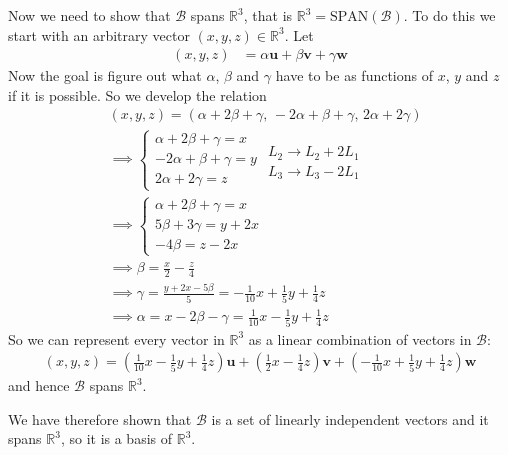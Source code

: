 {\noindent Now we need to show that $\mathcal{B}$ spans $\mathbb{R}^3$, that is $\mathbb{R}^3 = \text{SPAN}(\mathcal{B})$. To do this we start with an arbitrary vector $(x,y,z)\in\mathbb{R}^3$. Let
\begin{align*}
(x,y,z) &= \alpha \mathbf{u} +  \beta \mathbf{v} + \gamma \mathbf{w}
\end{align*}
Now the goal is figure out what $\alpha$, $\beta$ and $\gamma$ have to be as functions of $x$, $y$ and $z$ if it is possible. So we develop the relation
\begin{align*}
&(x,y,z) = (\alpha + 2\beta + \gamma, \, -2\alpha + \beta + \gamma, \, 2\alpha + 2\gamma) \\
%
%
& \implies  \begin{cases}
\alpha + 2\beta + \gamma = x \\
-2\alpha + \beta + \gamma = y \\
2\alpha + 2\gamma = z 
\end{cases}
\begin{matrix}
\, \\
L_2 \to L_2 + 2L_1 \\
L_3 \to L_3 - 2L_1 
\end{matrix} \\
%
%
& \implies  \begin{cases}
\alpha + 2\beta + \gamma = x \\
5\beta + 3\gamma = y+2x \\
-4\beta = z-2x
\end{cases} \\
%
%
& \implies \beta = \frac{x}{2} - \frac{z}{4} \\
& \implies \gamma = \frac{y+2x-5\beta}{5} = -\frac{1}{10}x + \frac{1}{5}y+\frac{1}{4}z \\
& \implies \alpha = x - 2\beta - \gamma = \frac{1}{10}x - \frac{1}{5}y+\frac{1}{4}z
\end{align*}
So we can represent every vector in $\mathbb{R}^3$ as a linear combination of vectors in $\mathcal{B}$:
\begin{align*}
(x,y,z) = \left(\frac{1}{10}x - \frac{1}{5}y+\frac{1}{4}z\right) \mathbf{u} +  \left(\frac{1}{2}x - \frac{1}{4}z\right) \mathbf{v} + \left(-\frac{1}{10}x + \frac{1}{5}y+\frac{1}{4}z\right)\mathbf{w}
\end{align*}
and hence $\mathcal{B}$ spans $\mathbb{R}^3$.

\noindent We have therefore shown that $\mathcal{B}$ is a set of linearly independent vectors and it spans $\mathbb{R}^3$, so it is a basis of $\mathbb{R}^3$.
}

